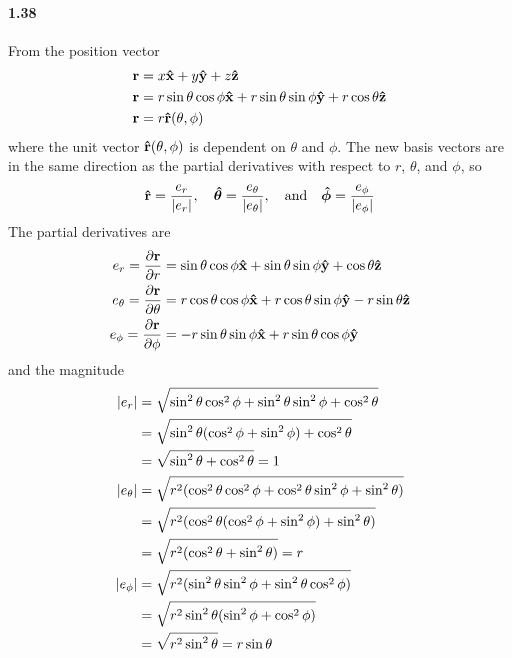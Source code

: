 \documentclass[../main.tex]{subfiles}
\begin{document}
\paragraph{1.38}
From the position vector
\begin{align*}
    \vb{r} &= x\vu{x} + y\vu{y} + z\vu{z} \\
    \vb{r} &= r\sin\theta \cos\phi\vu{x} + r\sin\theta \sin\phi\vu{y} + r\cos\theta \vu{z} \\
    \vb{r} &= r \vu{r}(\theta, \phi)
\end{align*}
where the unit vector $\vu{r}(\theta, \phi)$ is dependent on $\theta$ and $\phi$.
The new basis vectors are in the same direction as the partial derivatives with respect to $r$,
$\theta$, and $\phi$, so
\begin{align*}
    \vu{r} = \frac{e_r}{\abs{e_r}}, \quad
    \vu*{\theta} = \frac{e_{\theta}}{\abs{e_{\theta}}}, \qand
    \vu*{\phi} = \frac{e_{\phi}}{\abs{e_{\phi}}}
\end{align*}
The partial derivatives are
\begin{align*}
    e_r = \pdv{\vb{r}}{r} &= \sin\theta \cos\phi\vu{x} + \sin\theta \sin\phi\vu{y}
        + \cos\theta \vu{z} \\
    e_{\theta} = \pdv{\vb{r}}{\theta} &= r\cos\theta \cos\phi\vu{x} + r\cos\theta \sin\phi\vu{y}
        - r\sin\theta \vu{z} \\
    e_{\phi} = \pdv{\vb{r}}{\phi} &= -r\sin\theta \sin\phi\vu{x} + r\sin\theta \cos\phi\vu{y}
\end{align*}
and the magnitude
\begin{align*}
    \abs{e_r}
        &= \sqrt{\sin^2\theta \cos^2\phi + \sin^2\theta \sin^2\phi + \cos^2\theta} \\
        &= \sqrt{\sin^2\theta (\cos^2\phi + \sin^2\phi) + \cos^2\theta} \\
        &= \sqrt{\sin^2\theta + \cos^2\theta} = 1 \\
    \abs{e_{\theta}}
        &= \sqrt{r^2 (\cos^2\theta \cos^2\phi + \cos^2\theta \sin^2\phi + \sin^2\theta)} \\
        &= \sqrt{r^2 (\cos^2\theta (\cos^2\phi + \sin^2\phi) + \sin^2\theta)} \\
        &= \sqrt{r^2 (\cos^2\theta + \sin^2\theta)} = r \\
    \abs{e_{\phi}}
        &= \sqrt{r^2 (\sin^2\theta \sin^2\phi + \sin^2\theta \cos^2\phi)} \\
        &= \sqrt{r^2 \sin^2\theta (\sin^2\phi + \cos^2\phi)} \\
        &= \sqrt{r^2 \sin^2\theta} = r\sin\theta
\end{align*}
\end{document}

